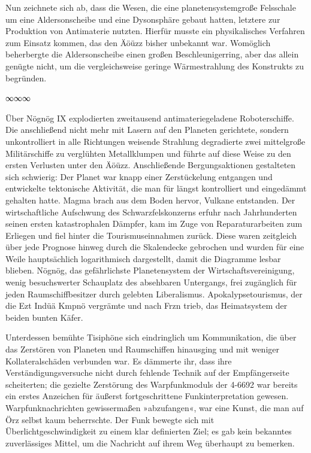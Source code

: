 Nun zeichnete sich ab, dass die Wesen, die eine planetensystemgroße Felsschale um eine Aldersonscheibe und eine Dysonsphäre gebaut hatten, letztere zur Produktion von Antimaterie nutzten. Hierfür musste ein physikalisches Verfahren zum Einsatz kommen, das den Äöüzz bisher unbekannt war. Womöglich beherbergte die Aldersonscheibe einen großen Beschleunigerring, aber das allein genügte nicht, um die vergleichsweise geringe Wärmestrahlung des Konstrukts zu begründen.

\begin{center}
∞∞∞
\end{center}

Über Nögnög IX explodierten zweitausend antimateriegeladene Roboterschiffe. Die anschließend nicht mehr mit Lasern auf den Planeten gerichtete, sondern unkontrolliert in alle Richtungen weisende Strahlung degradierte zwei mittelgroße Militärschiffe zu verglühten Metallklumpen und führte auf diese Weise zu den ersten Verlusten unter den Äöüzz. Anschließende Bergungsaktionen gestalteten sich schwierig: Der Planet war knapp einer Zerstückelung entgangen und entwickelte tektonische Aktivität, die man für längst kontrolliert und eingedämmt gehalten hatte. Magma brach aus dem Boden hervor, Vulkane entstanden. Der wirtschaftliche Aufschwung des Schwarzfelskonzerns erfuhr nach Jahrhunderten seinen ersten katastrophalen Dämpfer, kam im Zuge von Reparaturarbeiten zum Erliegen und fiel hinter die Tourismuseinnahmen zurück. Diese waren zeitgleich über jede Prognose hinweg durch die Skalendecke gebrochen und wurden für eine Weile hauptsächlich logarithmisch dargestellt, damit die Diagramme lesbar blieben. Nögnög, das gefährlichste Planetensystem der Wirtschaftsvereinigung, wenig besuchswerter Schauplatz des absehbaren Untergangs, frei zugänglich für jeden Raumschiffbesitzer durch gelebten Liberalismus. Apokalypsetourismus, der die Ezt Indüä Kmpnö vergrämte und nach Frzn trieb, das Heimatsystem der beiden bunten Käfer.

Unterdessen bemühte Tisiphöne sich eindringlich um Kommunikation, die über das Zerstören von Planeten und Raumschiffen hinausging und mit weniger Kollateralschäden verbunden war. Es dämmerte ihr, dass ihre Verständigungsversuche nicht durch fehlende Technik auf der Empfängerseite scheiterten; die gezielte Zerstörung des Warpfunkmoduls der 4-6692 war bereits ein erstes Anzeichen für äußerst fortgeschrittene Funkinterpretation gewesen. Warpfunknachrichten gewissermaßen »abzufangen«, war eine Kunst, die man auf Örz selbst kaum beherrschte. Der Funk bewegte sich mit Überlichtgeschwindigkeit zu einem klar definierten Ziel; es gab kein bekanntes zuverlässiges Mittel, um die Nachricht auf ihrem Weg überhaupt zu bemerken.


